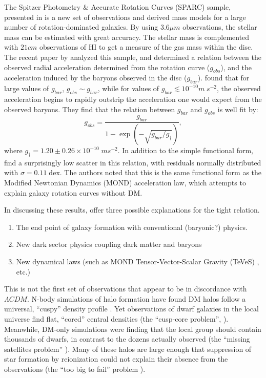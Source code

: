 The Spitzer Photometry \& Accurate Rotation Curves (SPARC) sample, presented in
\citet{Lelli2016} is a new set of observations and derived mass models for a large
number of rotation-dominated galaxies.  By using $3.6\mu m$ observations, the
stellar mass can be estimated with great accuracy.  The stellar mass is
complemented with $21 cm$ observations of {\sc HI} to get a measure of the gas
mass within the disc. The recent paper by \citet{McGaugh2016}
analyzed this sample, and determined a relation between the observed radial
acceleration determined from the rotation curve ($g_{obs}$), and the
acceleration induced by the baryons observed in the disc ($g_{bar}$).
\citet{McGaugh2016} found that for large values of $g_{bar}$, $g_{obs}\sim
g_{bar}$, while for values of $g_{bar} \lesssim 10^{-10} m\;s^{-2}$, the observed
acceleration begins to rapidly outstrip the acceleration one would expect from
the observed baryons.  They find that the relation between $g_{bar}$ and
$g_{obs}$ is well fit by:
\begin{equation} \label{g_fit}
    g_{obs} = \frac{g_{bar}}{1-\exp{(-\sqrt{g_{bar}/g_\dagger})}},
\end{equation}
where $g_\dagger=1.20\pm 0.26\times10^{-10}\;ms^{-2}$.  In addition to the
simple functional form, \citet{McGaugh2016} find a surprisingly low scatter in
this relation, with residuals normally distributed with $\sigma =
0.11\;\mathrm{dex}$.  The authors noted that this is the same functional form as
the Modified Newtonian Dynamics (MOND) \citep{Milgrom1983} acceleration law,
which attempts to explain galaxy rotation curves without DM.

In discussing these results, \citet{McGaugh2016} offer three possible
explanations for the tight relation. 
\begin{enumerate}
    \item The end point of galaxy formation with conventional (baryonic?)
        physics.
    \item New dark sector physics coupling dark matter and baryons
    \item New dynamical laws (such as MOND
        Tensor-Vector-Scalar Gravity (TeVeS)
        \citep{Bekenstein2004}, etc.)
\end{enumerate}

This is not the first set of observations that appear to be in discordance with
$\Lambda CDM$.  N-body simulations of halo formation have found DM halos follow
a universal, ``cuspy'' density profile \citep{Navarro1996}.  Yet observations of
dwarf galaxies in the local universe find flat, ``cored'' central densities (the
``cusp-core problem'', \citealt{Walker2011}).  Meanwhile, DM-only simulations
were finding that the local group should contain thousands of dwarfs, in
contrast to the dozens actually observed (the ``missing satellites problem''
\citealt{Klypin1999}).  Many of these halos are large enough that suppression of
star formation by reionization could not explain their absence from the
observations (the ``too big to fail'' problem \citealt{Boylan-Kolchin2011}).  

